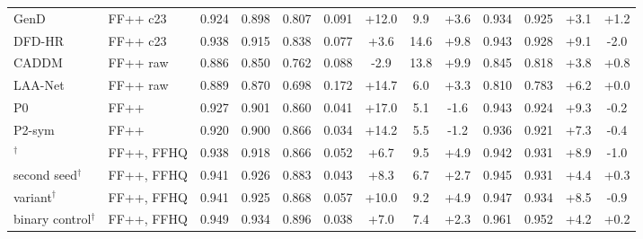 \begin{tabular}{@{}ll ccccccc cccc@{}}
GenD~\cite{gend2026} & FF++ c23 & 0.924 & 0.898 & 0.807 & 0.091 & +12.0 & 9.9 & +3.6 & 0.934 & 0.925 & +3.1 & +1.2 \\
DFD-HR~\cite{dfdhr2026} & FF++ c23 & 0.938 & 0.915 & 0.838 & 0.077 & +3.6 & 14.6 & +9.8 & 0.943 & 0.928 & +9.1 & -2.0 \\
CADDM~\cite{caddm} & FF++ raw & 0.886 & 0.850 & 0.762 & 0.088 & -2.9 & 13.8 & +9.9 & 0.845 & 0.818 & +3.8 & +0.8 \\
LAA-Net~\cite{laanet} & FF++ raw & 0.889 & 0.870 & 0.698 & 0.172 & +14.7 & 6.0 & +3.3 & 0.810 & 0.783 & +6.2 & +0.0 \\
\midrule
P0 & FF++ & 0.927 & 0.901 & 0.860 & 0.041 & +17.0 & 5.1 & -1.6 & 0.943 & 0.924 & +9.3 & -0.2 \\
P2-sym & FF++ & 0.920 & 0.900 & 0.866 & 0.034 & +14.2 & 5.5 & -1.2 & 0.936 & 0.921 & +7.3 & -0.4 \\
\ours{}$^\dagger$ & FF++, FFHQ & 0.938 & 0.918 & 0.866 & 0.052 & +6.7 & 9.5 & +4.9 & 0.942 & 0.931 & +8.9 & -1.0 \\
\quad second seed$^\dagger$ & FF++, FFHQ & 0.941 & 0.926 & 0.883 & 0.043 & +8.3 & 6.7 & +2.7 & 0.945 & 0.931 & +4.4 & +0.3 \\
\quad \ours{} variant$^\dagger$ & FF++, FFHQ & 0.941 & 0.925 & 0.868 & 0.057 & +10.0 & 9.2 & +4.9 & 0.947 & 0.934 & +8.5 & -0.9 \\
binary control$^\dagger$ & FF++, FFHQ & 0.949 & 0.934 & 0.896 & 0.038 & +7.0 & 7.4 & +2.3 & 0.961 & 0.952 & +4.2 & +0.2 \\
\bottomrule
\end{tabular}
